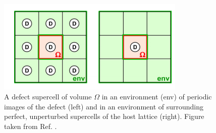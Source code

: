\documentclass[11pt, twoside]{report}
\begin{document}
\begin{figure}[h!]
  \centering
    \includegraphics[width=0.8\textwidth]{figures/LZ_ic.png}
    \caption{A defect supercell of volume $\Omega$ in an environment (env) of periodic images of the defect (left) and in an environment of surrounding perfect, unperturbed supercells of the host lattice (right). Figure taken from Ref. .}
  \label{LZ_ic}
\end{figure}
\end{document}
